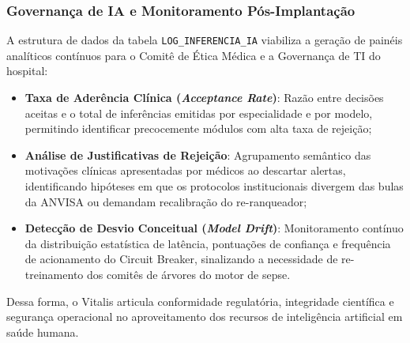 \subsubsection{Governança de IA e Monitoramento Pós-Implantação}
A estrutura de dados da tabela \texttt{LOG\_INFERENCIA\_IA} viabiliza a geração de painéis analíticos contínuos para o Comitê de Ética Médica e a Governança de TI do hospital:
\begin{itemize}
    \item \textbf{Taxa de Aderência Clínica (\textit{Acceptance Rate})}: Razão entre decisões aceitas e o total de inferências emitidas por especialidade e por modelo, permitindo identificar precocemente módulos com alta taxa de rejeição;
    \item \textbf{Análise de Justificativas de Rejeição}: Agrupamento semântico das motivações clínicas apresentadas por médicos ao descartar alertas, identificando hipóteses em que os protocolos institucionais divergem das bulas da ANVISA ou demandam recalibração do re-ranqueador;
    \item \textbf{Detecção de Desvio Conceitual (\textit{Model Drift})}: Monitoramento contínuo da distribuição estatística de latência, pontuações de confiança e frequência de acionamento do Circuit Breaker, sinalizando a necessidade de re-treinamento dos comitês de árvores do motor de sepse.
\end{itemize}

Dessa forma, o Vitalis articula conformidade regulatória, integridade científica e segurança operacional no aproveitamento dos recursos de inteligência artificial em saúde humana.
